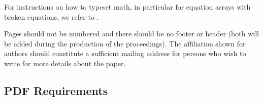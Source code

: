 \documentclass[conference,letterpaper]{IEEEtran}
\begin{document}



For instructions on how to typeset math, in particular for equation
arrays with broken equations, we refer to \cite{typesetmoser}.

Pages should not be numbered and there should be no footer or header
(both will be added during the production of the proceedings). The
affiliation shown for authors should constitute a sufficient mailing
address for persons who wish to write for more details about the
paper.


\subsection{PDF Requirements}
\end{document}
